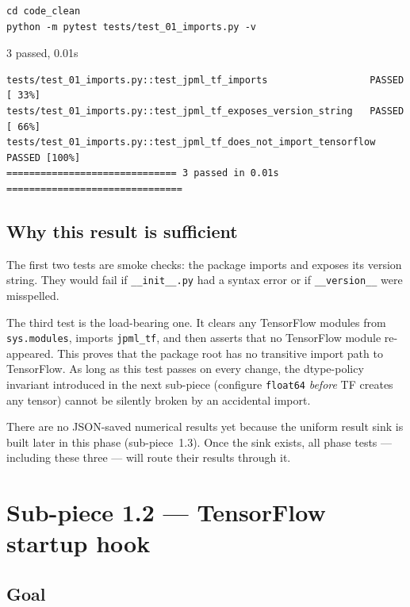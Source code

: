 \documentclass[11pt]{report}
\begin{document}
\begin{lstlisting}[style=shell]
cd code_clean
python -m pytest tests/test_01_imports.py -v
\end{lstlisting}

\begin{testresult}{3 passed, 0.01s}
\begin{lstlisting}[style=shell]
tests/test_01_imports.py::test_jpml_tf_imports                  PASSED [ 33%]
tests/test_01_imports.py::test_jpml_tf_exposes_version_string   PASSED [ 66%]
tests/test_01_imports.py::test_jpml_tf_does_not_import_tensorflow PASSED [100%]
============================== 3 passed in 0.01s ===============================
\end{lstlisting}
\end{testresult}

\subsection*{Why this result is sufficient}

The first two tests are smoke checks: the package imports and exposes
its version string. They would fail if \texttt{\_\_init\_\_.py} had a
syntax error or if \texttt{\_\_version\_\_} were misspelled.

The third test is the load-bearing one. It clears any TensorFlow
modules from \texttt{sys.modules}, imports \texttt{jpml\_tf}, and then
asserts that no TensorFlow module re-appeared. This proves that the
package root has no transitive import path to TensorFlow. As long as
this test passes on every change, the dtype-policy invariant introduced
in the next sub-piece (configure \texttt{float64} \emph{before} TF
creates any tensor) cannot be silently broken by an accidental import.

There are no JSON-saved numerical results yet because the uniform
result sink is built later in this phase (sub-piece~1.3). Once the sink
exists, all phase tests --- including these three --- will route their
results through it.

\section{Sub-piece 1.2 --- TensorFlow startup hook}

\subsection*{Goal}
\end{document}
